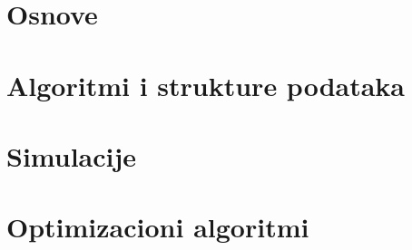 \section{Osnove}

\section{Algoritmi i strukture podataka}

\section{Simulacije}

\section{Optimizacioni algoritmi}